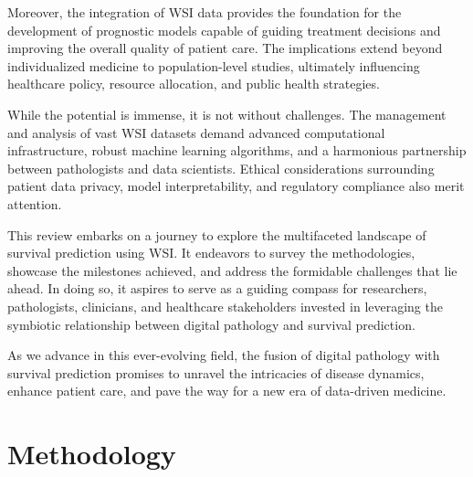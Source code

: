 \documentclass[journal,twoside,web]{ieeecolor}
\begin{document}
Moreover, the integration of WSI data provides the foundation for the development of prognostic models capable of guiding treatment decisions and improving the overall quality of patient care. The implications extend beyond individualized medicine to population-level studies, ultimately influencing healthcare policy, resource allocation, and public health strategies.

While the potential is immense, it is not without challenges. The management and analysis of vast WSI datasets demand advanced computational infrastructure, robust machine learning algorithms, and a harmonious partnership between pathologists and data scientists. Ethical considerations surrounding patient data privacy, model interpretability, and regulatory compliance also merit attention.

This review embarks on a journey to explore the multifaceted landscape of survival prediction using WSI. It endeavors to survey the methodologies, showcase the milestones achieved, and address the formidable challenges that lie ahead. In doing so, it aspires to serve as a guiding compass for researchers, pathologists, clinicians, and healthcare stakeholders invested in leveraging the symbiotic relationship between digital pathology and survival prediction.

As we advance in this ever-evolving field, the fusion of digital pathology with survival prediction promises to unravel the intricacies of disease dynamics, enhance patient care, and pave the way for a new era of data-driven medicine.

\section{Methodology}
\end{document}
